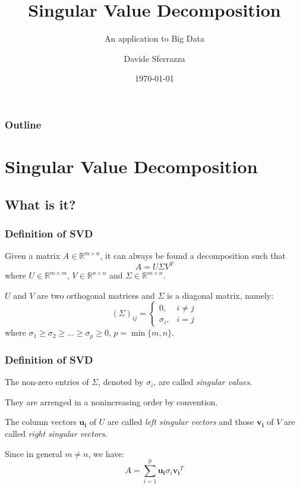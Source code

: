 \documentclass[10pt]{beamer}
\title{Singular Value Decomposition}
\subtitle{An application to Big Data}
\author{Davide Sferrazza}
\institute{Università degli Studi di Palermo}
\date{\today}
\begin{document}
\maketitle

\begin{frame}
    \frametitle{Outline}
    \tableofcontents
\end{frame}

\section{Singular Value Decomposition}
\subsection{What is it?}

\begin{frame}
    \frametitle{Definition of SVD}
    \begin{theorem}
        Given a matrix $A \in \mathbb{R}^{m \times n}$, it can always be found a decomposition such that
        $$A = U \Sigma V^T$$
        where $U \in \mathbb{R}^{m \times m}$, $V \in \mathbb{R}^{n \times n}$ and $\Sigma \in \mathbb{R}^{m \times n}$.

        $U$ and $V$ are two orthogonal matrices and $\Sigma$ is a diagonal matrix, namely:
        $$ ( \Sigma )_{ij} = 
            \begin{cases}
                0, & i \ne j \\
                \sigma_i, & i = j
            \end{cases} 
        $$
        where $\sigma_1 \ge \sigma_2 \ge \ldots  \ge \sigma_p \ge 0$, $p = \min\{m, n\}$.
    \end{theorem}
\end{frame}

\begin{frame}
    \frametitle{Definition of SVD}
    The non-zero entries of $\Sigma$, denoted by $\sigma_i$, are called \textit{singular values}.

    They are arrenged in a nonincreasing order by convention.

    The column vectors $\bm{u_i}$ of $U$ are called \textit{left singular vectors} and those $\bm{v_i}$ of $V$ are called \textit{right singular vectors}. \bigskip
    
    Since in general $m \ne n$, we have: 
    $$ A = \sum_{i = 1}^{p} \bm{u_i} \sigma_i \bm{v_i}^T $$

\end{frame}
\end{document}
